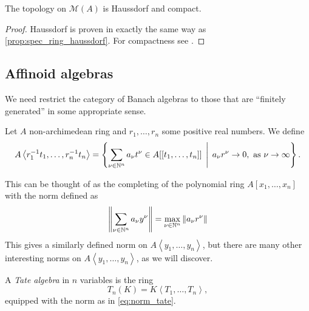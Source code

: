 \begin{proposition}
	The topology on $\mathcal{M} (A)$ is Haussdorf and compact. 
\end{proposition}
\begin{proof}
	Haussdorf is proven in exactly the same way as \cref{prop:spec_ring_haussdorf}.
	For compactness see \cite[][thm.\ 1.2.1]{berkovichSpectralTheoryAnalytic2012}.
\end{proof}
\subsection{Affinoid algebras} \label{sec:affinoid_algebras}
We need restrict the category of Banach algebras to those that are ``finitely generated'' in some appropriate sense. 

\begin{definition}
	Let $A$ non-archimedean ring and $r_1, \ldots, r_n$ some positive real numbers. We define \[
		A \left<r_1^{-1}t_1, \ldots, r_{n}^{-1} t_n \right> = \left\{\sum_{\nu \in \N^{n}}^{} a_\nu t^{\nu} \in A[[t_1,\ldots, t_n]]\st a_\nu r^{\nu} \to 0, \text{ as } \nu \to \infty\right\} 
	.\] 
\end{definition}
This can be thought of as the completing of the polynomial ring $A[x_1, \ldots, x_n]$ with the norm defined as 
\begin{equation}\label{eq:norm_tate}
	\left\| \sum_{\nu \in \mathbb{N}^{n}} a_\nu y^{\nu}\right\| = \max_{\nu \in \mathbb{N}^{n}} \|a_\nu r^{\nu}\|
\end{equation}
This gives a similarly defined norm on $A\left<y_1, \ldots, y_n \right>$, but there are many other interesting norms on $A \left<y_1, \ldots, y_n \right>$, as we will discover. 



\begin{definition}
	A \emph{Tate algebra} in $n$ variables is the ring \[
		T_n(K) = K\left<T_1, \ldots, T_n \right>
	,\]
	equipped with the norm as in \eqref{eq:norm_tate}.
\end{definition}

